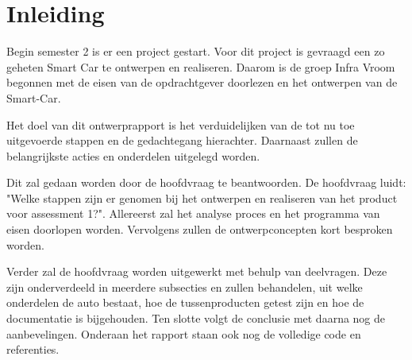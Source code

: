 \section{Inleiding}
Begin semester 2 is er een project gestart. Voor dit project is gevraagd een zo geheten Smart Car te ontwerpen en realiseren. Daarom is de groep Infra Vroom begonnen met de eisen van de opdrachtgever doorlezen en het ontwerpen van de \gls{Smart-Car}. 

Het doel van dit ontwerprapport is het verduidelijken van de tot nu toe uitgevoerde stappen en de gedachtegang hierachter. Daarnaast zullen de belangrijkste acties en onderdelen uitgelegd worden. 

Dit zal gedaan worden door de hoofdvraag te beantwoorden. De hoofdvraag luidt: "Welke stappen zijn er genomen bij het ontwerpen en realiseren van het product voor assessment 1?". Allereerst zal het analyse proces en het programma van eisen doorlopen worden. Vervolgens zullen de ontwerpconcepten kort besproken worden. 

 Verder zal de hoofdvraag worden uitgewerkt met behulp van deelvragen. Deze zijn onderverdeeld in meerdere subsecties en zullen behandelen, uit welke onderdelen de auto bestaat, hoe de tussenproducten getest zijn en hoe de documentatie is bijgehouden. Ten slotte volgt de conclusie met daarna nog de aanbevelingen. Onderaan het rapport staan ook nog de volledige code en referenties.  